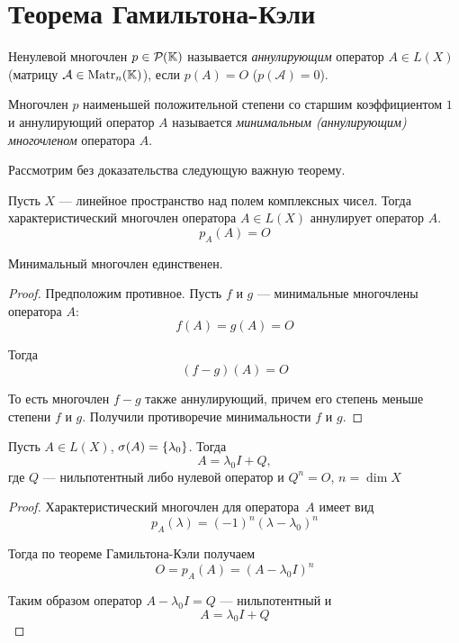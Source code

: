\section{Теорема Гамильтона-Кэли}
\begin{definition}
    Ненулевой многочлен $p \in \mathcal{P}_{}({\mathbb{K}})$ называется \emph{аннулирующим} оператор $A
    \in L(X)$ (матрицу $\mathcal{A} \in \mathrm{Matr}_{n}({\mathbb{K}})$), если $p(A) = O$
    ($p(\mathcal{A}) = 0$).
\end{definition}

\begin{definition}
    Многочлен $p$ наименьшей положительной степени со старшим коэффициентом $1$
    и аннулирующий оператор $A$ называется \emph{минимальным (аннулирующим) многочленом}
    оператора $A$.
\end{definition}

Рассмотрим без доказательства следующую важную теорему.

\begin{theorem} \label{th:hamiltoncayley}
    Пусть $X$ — линейное пространство над полем комплексных чисел.
    Тогда характеристический многочлен оператора $A \in L(X)$ аннулирует оператор
    $A$.
    \[ p_A(A) = O \]
\end{theorem}

\begin{lemma}
    Минимальный многочлен единственен.
\end{lemma}

\begin{proof}
    Предположим противное. Пусть $f$ и $g$ — минимальные многочлены оператора $A$:
    \[ f(A) = g(A) = O \]

    Тогда
    \[ (f - g)(A) = O \]

    То есть многочлен $f - g$ также аннулирующий, причем его степень меньше
    степени $f$ и $g$. Получили противоречие минимальности $f$ и $g$.
\end{proof}

\begin{corollaryth}
    Пусть $A\in L(X)$, $\operatorname{\sigma}(A) = \left\{\lambda_0\right\}$. Тогда
    \[ A = \lambda_0 I + Q, \]
    где $Q$ — нильпотентный либо нулевой оператор и $Q^n = O$, $n = \dim X$
\end{corollaryth}

\begin{proof}
    Характеристический многочлен для оператора~$A$ имеет вид
    \[ p_A(\lambda) = (-1)^n (\lambda-\lambda_0)^n \]

    Тогда по теореме Гамильтона-Кэли получаем
    \[ O = p_A(A) = (A-\lambda_0 I)^n \]

    Таким образом оператор $A-\lambda_0 I = Q$ — нильпотентный и 
    \[ A = \lambda_0 I + Q \]
\end{proof}
